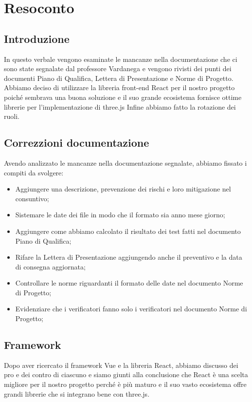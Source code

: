 \section{Resoconto}
\subsection{Introduzione}

In questo verbale vengono esaminate le mancanze nella documentazione che ci sono state segnalate dal professore Vardanega e vengono rivisti dei punti dei documenti Piano di Qualifica, Lettera di Presentazione e Norme di Progetto.
Abbiamo deciso di utilizzare la libreria front-end React per il nostro progetto poiché sembrava una buona soluzione e il suo grande ecosistema fornisce ottime librerie per l'implementazione di three.js
Infine abbiamo fatto la rotazione dei ruoli.

\subsection{Correzzioni documentazione}
Avendo analizzato le mancanze nella documentazione segnalate, abbiamo fissato i compiti da svolgere:
\begin{itemize}
    \item Aggiungere una descrizione, prevenzione dei rischi e loro mitigazione nel consuntivo;
    \item Sistemare le date dei file in modo che il formato sia anno mese giorno;
    \item Aggiungere come abbiamo calcolato il risultato dei test fatti nel documento Piano di Qualifica;
    \item Rifare la Lettera di Presentazione aggiungendo anche il preventivo e la data di consegna aggiornata;
    \item Controllare le norme riguardanti il formato delle date nel documento Norme di Progetto;
    \item Evidenziare che i verificatori fanno solo i verificatori nel documento Norme di Progetto;
\end{itemize}
\subsection{Framework}
Dopo aver ricercato il framework Vue e la libreria React, abbiamo discusso dei pro e dei contro di ciascuno e siamo giunti alla conclusione che React è una scelta migliore per il nostro progetto perché è più maturo e il suo vasto ecosistema offre grandi librerie che si integrano bene con three.js.
